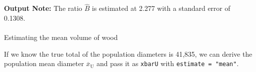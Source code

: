 \documentclass[
  letterpaper,
  DIV=11,
  numbers=noendperiod]{scrreprt}
\makeatletter
\let\oldparagraph\paragraph
\renewcommand{\paragraph}{
    \@ifstar
      \xxxParagraphStar
      \xxxParagraphNoStar
  }
\newcommand{\xxxParagraphStar}[1]{\oldparagraph*{#1}\mbox{}}
\newcommand{\xxxParagraphNoStar}[1]{\oldparagraph{#1}\mbox{}}
\newenvironment{Shaded}{\begin{snugshade}}{\end{snugshade}}
\newcommand{\AttributeTok}[1]{\textcolor[rgb]{0.40,0.45,0.13}{#1}}
\newcommand{\DecValTok}[1]{\textcolor[rgb]{0.68,0.00,0.00}{#1}}
\newcommand{\FunctionTok}[1]{\textcolor[rgb]{0.28,0.35,0.67}{#1}}
\newcommand{\NormalTok}[1]{\textcolor[rgb]{0.00,0.23,0.31}{#1}}
\newcommand{\OtherTok}[1]{\textcolor[rgb]{0.00,0.23,0.31}{#1}}
\newcommand{\SpecialCharTok}[1]{\textcolor[rgb]{0.37,0.37,0.37}{#1}}
\newcommand{\StringTok}[1]{\textcolor[rgb]{0.13,0.47,0.30}{#1}}
\renewcommand{\[}{\begin{equation}}
\renewcommand{\]}{\end{equation}}
\makeatother
\begin{document}
\textbf{Output Note:} The ratio \(\hat{B}\) is estimated at 2.277 with a
standard error of 0.1308.

\paragraph{Estimating the mean volume of
wood}\label{estimating-the-mean-volume-of-wood}

If we know the true total of the population diameters is 41,835, we can
derive the population mean diameter \(\overline{x}_{\text{U}}\) and pass
it as \texttt{xbarU} with \texttt{estimate\ =\ "mean"}.

\begin{Shaded}
\end{Shaded}
\end{document}
